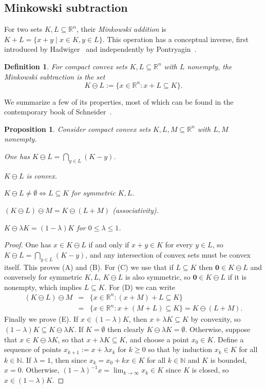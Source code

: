 \documentclass[12pt,english]{article}
\theoremstyle{theorem}
\newtheorem{proposition}[theorem]{Proposition}
\newtheorem{definition}[theorem]{Definition}
\theoremstyle{remark}
\providecommand{\setR}{\mathbb{R}}
\begin{document}
\subsection{Minkowski subtraction}

For two sets $K,L \subseteq \setR^n$, their \emph{Minkowski addition} is $K + L = \{ x + y \mid x \in K, y \in L\}$.
This operation has a conceptual inverse, first introduced by Hadwiger~\cite{Hadwiger1950} and independently by Pontryagin~\cite{Pontryagin1967V2}.
\begin{definition}
  For compact convex sets $K,L \subseteq \setR^n$ with $L$ nonempty, the \emph{Minkowski subtraction} is
  the set
  \[
   K \ominus L := \{ x \in \setR^n : x + L \subseteq K \}.
  \]
\end{definition}
We summarize a few of its properties, most of which can be found in the contemporary book of Schneider~\cite[Page 146+]{Schneider_2013}.
\begin{proposition} \label{prop:PropertiesOfSubtraction}
  Consider compact convex sets $K,L,M \subseteq \setR^n$ with $L,M$ nonempty.
  \begin{enumerate*}
  \item[(A)] One has $K \ominus L = \bigcap_{y \in L} (K-y)$.
  \item[(B)] $K \ominus L$ is convex.
  \item[(C)] $K \ominus L \neq \emptyset \iff L \subseteq K$ for symmetric $K, L$.
  \item[(D)] $(K \ominus L) \ominus M = K \ominus (L + M)$ (associativity).
  \item[(E)] $K \ominus \lambda K = (1-\lambda)K$ for $0 \leq \lambda \leq 1$.
  \end{enumerate*}
\end{proposition}
\begin{proof}
  One has $x \in K \ominus L$ if and only if $x + y \in K$ for every $y \in L$, so $K \ominus L = \bigcap_{y \in L} (K-y)$, and any intersection of convex sets must be convex itself. This proves (A) and (B).
  For (C) we use that if $L \subseteq K$ then $\bm{0} \in K \ominus L$ and conversely for symmetric $K,L$, $K \ominus L$ is also symmetric, so $\bm{0} \in K \ominus L$ if it is nonempty, which implies $L \subseteq K$.
  For (D) we can write
  \begin{eqnarray*}
    (K \ominus L) \ominus M &=& \{x \in \setR^n : (x + M) + L \subseteq K\} \\ &=& \{x \in \setR^n : x + (M+L) \subseteq K\} = K \ominus (L + M).
  \end{eqnarray*}
  Finally we prove (E).
  If $x \in (1-\lambda)K$, then $x + \lambda K \subseteq K$ by convexity, so $(1 - \lambda) K \subseteq K \ominus \lambda K$. If $K = \emptyset$ then clearly $K \ominus \lambda K = \emptyset$. Otherwise, suppose that $x \in K \ominus \lambda K$, so that $x + \lambda K \subseteq K$, and choose a point $x_0 \in K$. Define a sequence of points $x_{k+1} := x + \lambda x_k$ for $k \ge 0$ so that by induction $x_k \in K$ for all $k \in \mathbb{N}$. If $\lambda = 1$, then since $x_k = x_0 + kx \in K$ for all $k \in \mathbb{N}$ and $K$ is bounded, $x = 0$. Otherwise, $(1-\lambda)^{-1} x = \lim_{k \to \infty} x_k \in K$ since $K$ is closed, so $x \in (1-\lambda) K$.
\end{proof}
\end{document}
